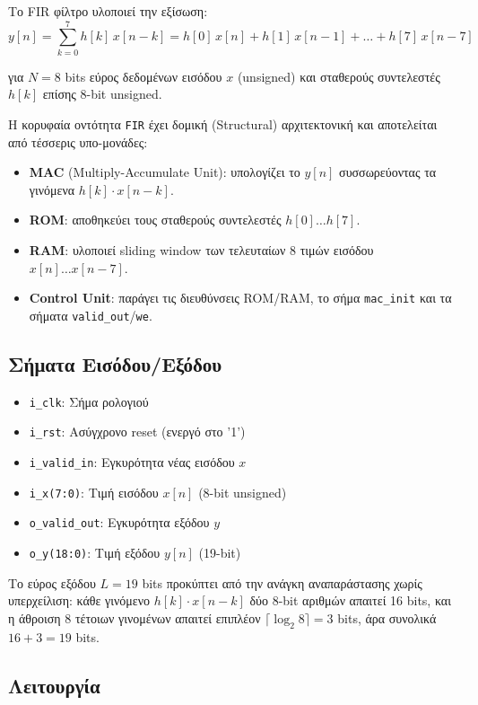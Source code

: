 \documentclass[12pt]{article}
\begin{document}
Το FIR φίλτρο υλοποιεί την εξίσωση:
\[
    y[n] = \sum_{k=0}^{7} h[k]\, x[n-k]
    = h[0]\,x[n] + h[1]\,x[n-1] + \ldots + h[7]\,x[n-7]
\]

για $N = 8$ bits εύρος δεδομένων εισόδου $x$ (unsigned) και σταθερούς συντελεστές $h[k]$ επίσης 8-bit unsigned.

Η κορυφαία οντότητα \texttt{FIR} έχει δομική (Structural) αρχιτεκτονική και αποτελείται από τέσσερις υπο-μονάδες:

\begin{itemize}
    \item \textbf{MAC} (Multiply-Accumulate Unit): υπολογίζει το $y[n]$ συσσωρεύοντας τα γινόμενα $h[k] \cdot x[n-k]$.
    \item \textbf{ROM}: αποθηκεύει τους σταθερούς συντελεστές $h[0]\ldots h[7]$.
    \item \textbf{RAM}: υλοποιεί sliding window των τελευταίων 8 τιμών εισόδου $x[n]\ldots x[n-7]$.
    \item \textbf{Control Unit}: παράγει τις διευθύνσεις ROM/RAM, το σήμα \texttt{mac\_init} και τα σήματα \texttt{valid\_out}/\texttt{we}.
\end{itemize}

\subsection*{Σήματα Εισόδου/Εξόδου}

\begin{itemize}
    \item \texttt{i\_clk}: Σήμα ρολογιού
    \item \texttt{i\_rst}: Ασύγχρονο reset (ενεργό στο '1')
    \item \texttt{i\_valid\_in}: Εγκυρότητα νέας εισόδου $x$
    \item \texttt{i\_x(7:0)}: Τιμή εισόδου $x[n]$ (8-bit unsigned)
    \item \texttt{o\_valid\_out}: Εγκυρότητα εξόδου $y$
    \item \texttt{o\_y(18:0)}: Τιμή εξόδου $y[n]$ (19-bit)
\end{itemize}

Το εύρος εξόδου $L = 19$ bits προκύπτει από την ανάγκη αναπαράστασης χωρίς υπερχείλιση: κάθε γινόμενο $h[k] \cdot x[n-k]$ δύο 8-bit αριθμών απαιτεί 16 bits, και η άθροιση 8 τέτοιων γινομένων απαιτεί επιπλέον $\lceil\log_2 8\rceil = 3$ bits, άρα συνολικά $16 + 3 = 19$ bits.

\subsection*{Λειτουργία}
\end{document}
